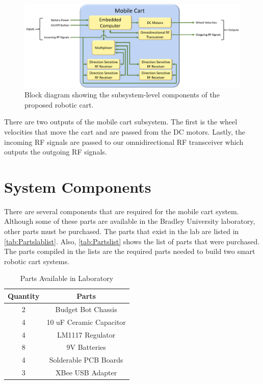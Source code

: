 \begin{figure}[H]
  \centering
  \includegraphics[width=\textwidth]{figs/img/mobileCartBlockDiagram.png}
  \caption{Block diagram showing the subsystem-level components of the proposed robotic cart.}
  \label{fig:mobile_block_diag}
\end{figure}

\vspace*{12pt}
\noindent
There are two outputs of the mobile cart subsystem. The first is the wheel velocities that move the cart and are passed from the DC motors. Lastly, the incoming RF signals are passed to our omnidirectional RF transceiver which outputs the outgoing RF signals.


\section{System Components}
\label{sec:System Components}

There are several components that are required for the mobile cart system.
Although some of these parts are available in the Bradley University laboratory,
other parts must be purchased. The parts that exist in the lab are listed in
\autoref{tab:Partslablist}. Also, \autoref{tab:Partslist} shows the list of
parts that were purchased. The parts compiled in the lists are the required
parts needed to build two smart robotic cart systems.

\begin{table}[H]
  \centering
  \caption{Parts Available in Laboratory}
  \begin{tabular}{c|c}
      \toprule
      \textbf{Quantity} & \textbf{Parts}\\
      \toprule
      2 & Budget Bot Chassis\\
      4 & 10 uF Ceramic Capacitor\\
      4 & LM1117 Regulator\\
      8 & 9V Batteries\\
      4 & Solderable PCB Boards\\
      3 & XBee USB Adapter\\
      \bottomrule
  \end{tabular}
  \label{tab:Partslablist}
\end{table}

